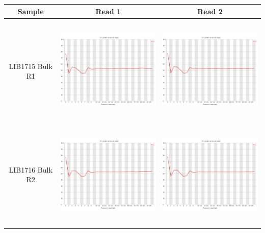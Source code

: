 \begin{center}
\begin{tabular}{ccc}
\bottomrule
\end{tabular}
\end{center}

\begin{center}
\begin{tabular}{ccc}
\toprule
Sample  & Read 1 & Read 2 \\ \midrule 
\\
\begin{sideways}LIB1715 Bulk R1\end{sideways} & \includegraphics[height=5cm]{Appendices/images/Sample_LIB1715_base_gc_R1.png} & \includegraphics[height=5cm]{Appendices/images/Sample_LIB1715_base_gc_R2.png} \\ \midrule  \\
\begin{sideways}LIB1716 Bulk R2\end{sideways} & \includegraphics[height=5cm]{Appendices/images/Sample_LIB1716_base_gc_R1.png} & \includegraphics[height=5cm]{Appendices/images/Sample_LIB1716_base_gc_R2.png} \\ \midrule  \\

\end{tabular}
\end{center}
